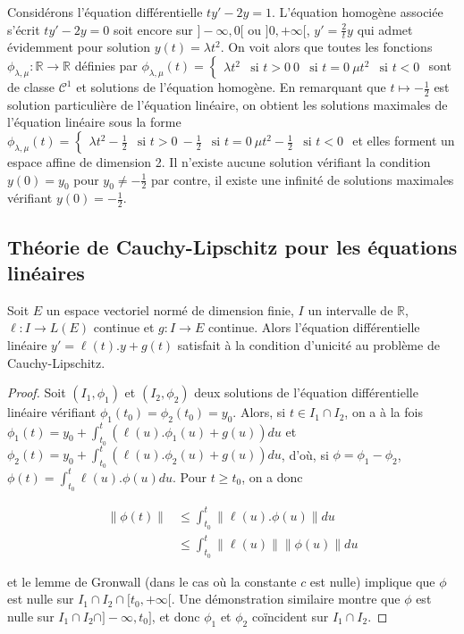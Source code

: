 \begin{example}
Considérons l'équation différentielle $ty' - 2y = 1$.
L'équation homogène associée s'écrit $ty' - 2y = 0$ soit encore sur $]-\infty,0[$ ou $]0,+\infty[$, $y' = \frac{2}{t} y$ qui admet
évidemment pour solution $y(t) = \lambda t^2$. On voit alors que
toutes les fonctions $\phi_{\lambda,\mu} : \mathbb{R} \rightarrow \mathbb{R}$ définies par
$\phi_{\lambda,\mu}(t) = \begin{cases}
\lambda t^2 & \text{si } t > 0 \
0 & \text{si } t = 0 \
\mu t^2 & \text{si } t < 0
\end{cases}$ sont de classe $\mathcal{C}^1$
et solutions de l'équation homogène. En remarquant que
$t \mapsto -\frac{1}{2}$ est
solution particulière de l'équation linéaire, on obtient les solutions
maximales de l'équation linéaire sous la forme
$\phi_{\lambda,\mu}(t) = \begin{cases}
\lambda t^2 - \frac{1}{2} & \text{si } t > 0 \
-\frac{1}{2} & \text{si } t = 0 \
\mu t^2 - \frac{1}{2} & \text{si } t < 0
\end{cases}$
et elles forment un espace affine de dimension 2.
Il n'existe aucune solution vérifiant la condition $y(0) = y_0$
pour $y_0 \neq -\frac{1}{2}$ par contre, il existe une infinité de solutions maximales vérifiant
$y(0) = -\frac{1}{2}$.
\end{example}
\subsection{Théorie de Cauchy-Lipschitz pour les équations linéaires}
\begin{lem}
Soit $E$ un espace vectoriel normé de dimension finie, $I$ un
intervalle de $\mathbb{R}$, $\ell : I \rightarrow L(E)$ continue et $g : I \rightarrow E$ continue. Alors
l'équation différentielle linéaire $y' = \ell(t).y + g(t)$ satisfait à la
condition d'unicité au problème de Cauchy-Lipschitz.
\end{lem}
\begin{proof}
Soit $(I_1,\phi_1)$ et
$(I_2,\phi_2)$ deux solutions de l'équation différentielle
linéaire vérifiant $\phi_1(t_0) = \phi_2(t_0) = y_0$. Alors, si $t \in I_1 \cap I_2$, on a à la fois $\phi_1(t) = y_0 + \int_{t_0}^t (\ell(u).\phi_1(u) + g(u)) du$ et
$\phi_2(t) = y_0 + \int_{t_0}^t (\ell(u).\phi_2(u) + g(u)) du$, d'où, si
$\phi = \phi_1 - \phi_2$, $\phi(t) = \int_{t_0}^t \ell(u).\phi(u) du$. Pour $t \geq t_0$, on a
donc

\begin{align*}
\|\phi(t)\| &\leq \int_{t_0}^t \|\ell(u).\phi(u)\| du \\
&\leq \int_{t_0}^t \|\ell(u)\| \|\phi(u)\| du
\end{align*}

et le lemme de Gronwall (dans le cas où la constante $c$ est nulle)
implique que $\phi$ est nulle sur $I_1 \cap I_2 \cap [t_0,+\infty[$. Une démonstration similaire montre que $\phi$ est
nulle sur $I_1 \cap I_2 \cap ]-\infty,t_0]$, et donc
$\phi_1$ et $\phi_2$ coïncident sur $I_1 \cap I_2$.
\end{proof}

